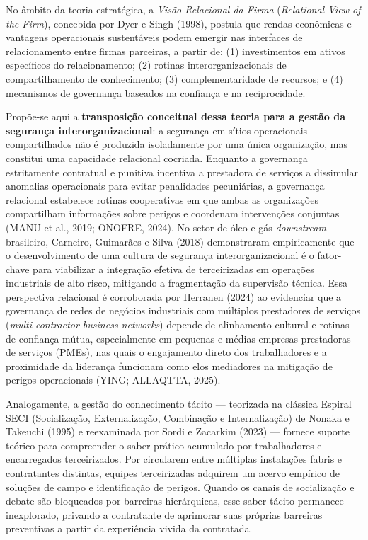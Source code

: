\documentclass[12pt,a4paper]{article}
\begin{document}
No âmbito da teoria estratégica, a \textit{Visão Relacional da Firma} (\textit{Relational View of the Firm}), concebida por Dyer e Singh (1998), postula que rendas econômicas e vantagens operacionais sustentáveis podem emergir nas interfaces de relacionamento entre firmas parceiras, a partir de: (1) investimentos em ativos específicos do relacionamento; (2) rotinas interorganizacionais de compartilhamento de conhecimento; (3) complementaridade de recursos; e (4) mecanismos de governança baseados na confiança e na reciprocidade. 

Propõe-se aqui a \textbf{transposição conceitual dessa teoria para a gestão da segurança interorganizacional}: a segurança em sítios operacionais compartilhados não é produzida isoladamente por uma única organização, mas constitui uma capacidade relacional cocriada. Enquanto a governança estritamente contratual e punitiva incentiva a prestadora de serviços a dissimular anomalias operacionais para evitar penalidades pecuniárias, a governança relacional estabelece rotinas cooperativas em que ambas as organizações compartilham informações sobre perigos e coordenam intervenções conjuntas (MANU et al., 2019; ONOFRE, 2024). No setor de óleo e gás \textit{downstream} brasileiro, Carneiro, Guimarães e Silva (2018) demonstraram empiricamente que o desenvolvimento de uma cultura de segurança interorganizacional é o fator-chave para viabilizar a integração efetiva de terceirizadas em operações industriais de alto risco, mitigando a fragmentação da supervisão técnica. Essa perspectiva relacional é corroborada por Herranen (2024) ao evidenciar que a governança de redes de negócios industriais com múltiplos prestadores de serviços (\textit{multi-contractor business networks}) depende de alinhamento cultural e rotinas de confiança mútua, especialmente em pequenas e médias empresas prestadoras de serviços (PMEs), nas quais o engajamento direto dos trabalhadores e a proximidade da liderança funcionam como elos mediadores na mitigação de perigos operacionais (YING; ALLAQTTA, 2025).

Analogamente, a gestão do conhecimento tácito — teorizada na clássica Espiral SECI (Socialização, Externalização, Combinação e Internalização) de Nonaka e Takeuchi (1995) e reexaminada por Sordi e Zacarkim (2023) — fornece suporte teórico para compreender o saber prático acumulado por trabalhadores e encarregados terceirizados. Por circularem entre múltiplas instalações fabris e contratantes distintas, equipes terceirizadas adquirem um acervo empírico de soluções de campo e identificação de perigos. Quando os canais de socialização e debate são bloqueados por barreiras hierárquicas, esse saber tácito permanece inexplorado, privando a contratante de aprimorar suas próprias barreiras preventivas a partir da experiência vivida da contratada.
\end{document}

